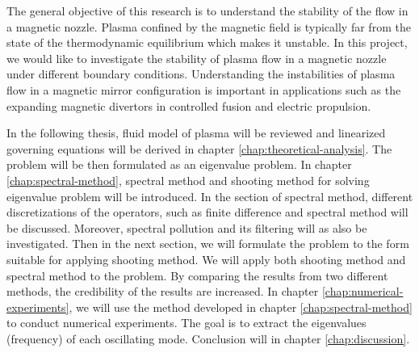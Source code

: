 The general objective of this research is to understand the stability of the flow in a magnetic nozzle. Plasma confined by the magnetic field is typically far from the state of the thermodynamic equilibrium which makes it unstable. In this project, we would like to investigate the stability of plasma flow in a magnetic nozzle under different boundary conditions. Understanding the instabilities of plasma flow in a magnetic mirror configuration is important in applications such as the expanding magnetic divertors in controlled fusion and electric propulsion. \cite{ryutov_divertor_2016,kaganovich_2020_physics}

In the following thesis, fluid model of plasma will be reviewed and linearized governing equations will be derived in chapter \ref{chap:theoretical-analysis}. The problem will be then formulated as an eigenvalue problem. In chapter \ref{chap:spectral-method}, spectral method and shooting method for solving eigenvalue problem will be introduced. In the section of spectral method, different discretizations of the operators, such as finite difference and spectral method will be discussed. Moreover, spectral pollution and its filtering will as also be investigated. Then in the next section, we will formulate the problem to the form suitable for applying shooting method. We will apply both shooting method and spectral method to the problem. By comparing the results from two different methods, the credibility of the results are increased. In chapter \ref{chap:numerical-experiments}, we will use the method developed in chapter \ref{chap:spectral-method} to conduct numerical experiments. The goal is to extract the eigenvalues (frequency) of each oscillating mode. Conclusion will in chapter \ref{chap:discussion}.
